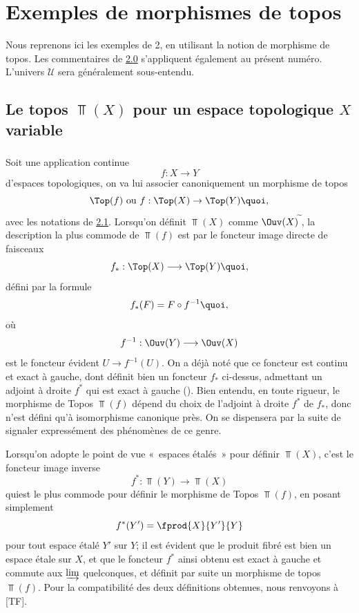 \documentclass[10pt]{../fichiers-configuration-latex/smfart}
\begin{document}
\section{Exemples de morphismes de topos}

Nous reprenons ici les exemples de 2, en utilisant la notion de
morphisme de topos. Les commentaires de \hyperref[IV.subsec2.0]{2.0}
s'appliquent également au présent numéro. L'univers
$𝒰$ sera généralement sous-entendu.

\subsection{Le topos $\Top(X)$ pour un espace topologique $X$
variable}\pageoriginale

\subsubsection{}
Soit une application continue
$$
f:X\longrightarrow Y
$$
d'espaces topologiques, on va lui associer canoniquement un
morphisme de topos
$$
\Top(f)\mbox{ ou } f:\Top(X)\rightarrow \Top(Y){\quoi},
$$
avec les notations de \hyperref[IV.subsec2.1]{2.1}. Lorsqu'on définit
$\Top(X)$ comme $\Ouv(X)^{\widetilde{\phantom{,}}}$, la description
la plus commode de $\Top(f)$ est par le foncteur image directe de
faisceaux
$$
f_{\ast}:\Top(X)\longrightarrow \Top(Y){\quoi},
$$
défini par la formule
$$
f_{\ast}(F)=F\circ f^{-1}{\quoi},
$$
où
$$
f^{-1}:\Ouv(Y)\longrightarrow \Ouv(X)
$$
est le foncteur évident $U\rightarrow f^{-1}(U)$. On a déjà noté que
ce foncteur est continu et exact à gauche, dont définit bien un
foncteur $f_{\ast}$ ci-dessus, admettant un adjoint à droite
$f^{\ast}$ qui est exact à gauche (). Bien
entendu, en toute rigueur, le morphisme de Topos $\Top(f)$ dépend du
choix de l'adjoint à droite $f^{\ast}$ de $f_{\ast}$, donc n'est
défini qu'à isomorphisme canonique près. On se dispensera par la
suite de signaler expressément des phénomènes de ce genre.

Lorsqu'on adopte le point de vue « espaces étalés »  pour
définir $\Top(X)$, c'est le foncteur image inverse
$$
f^{\ast}:\Top(Y)\longrightarrow \Top(X)
$$
qui\pageoriginale est le plus commode pour définir le morphisme de
Topos $\Top(f)$, en posant simplement
$$
f^{\ast}(Y')=\fprod{X}{Y'}{Y}
$$
pour tout espace étalé $Y'$ sur $Y$; il est évident que le
produit fibré est bien un espace étale sur $X$, et que le
foncteur $f^{\ast}$ ainsi obtenu est exact à gauche et commute aux
$\varinjlim$ quelconques, et définit par suite un morphisme de
topos $\Top(f)$. Pour la compatibilité des deux définitions
obtenues, nous renvoyons à [TF].
\end{document}
